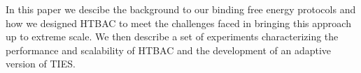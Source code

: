 
In this paper we descibe the background to our binding free energy protocols
and how we designed HTBAC to meet the challenges faced in bringing this
approach up to extreme scale. We then describe a set of experiments
characterizing the performance and scalability of HTBAC and the development of
an adaptive version of TIES. 

